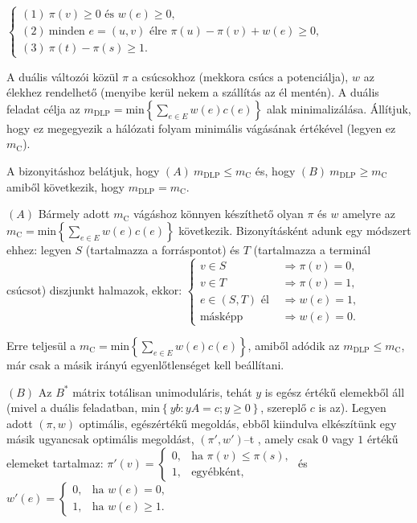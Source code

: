 $\begin{cases}
		(1)~\pi(v) \geq 0 \mbox{ és } w(e) \geq 0,                             \\
		(2)~\mbox{minden } e = (u,v) \mbox{ élre }  \pi(u)-\pi(v)+w(e) \geq 0, \\
		(3)~\pi(t)-\pi(s) \geq 1.\end{cases}$

A duális változói közül $\pi$ a csúcsokhoz (mekkora csúcs a potenciálja), $w$ az
élekhez rendelhető (menyibe kerül nekem a szállítás az él mentén). A duális
feladat célja az $m_{\text{DLP}}= \mbox{min} \left\{ \sum_{e\in E}^{}
	w(e)c(e)\right\}$ alak minimalizálása. Állítjuk, hogy ez megegyezik a hálózati
folyam minimális vágásának értékével (legyen ez $m_{\text{C}}$).

A bizonyitáshoz belátjuk, hogy $(A)~m_{\mbox{DLP}} \leq m_{\mbox{C}}$ és, hogy
$(B)~m_{\mbox{DLP}} \geq m_{\mbox{C}}$ amiből következik, hogy $ m_{\mbox{DLP}}
	= m_{\mbox{C}}$.

$(A)$ Bármely adott $m_{\mbox{C}}$ vágáshoz könnyen készíthető olyan $\pi$ és $w$
amelyre az $m_{\text{C}}= \mbox{min} \left\{ \sum_{e\in E}^{} w(e)c(e)\right\}$
következik. Bizonyításként adunk egy módszert ehhez: legyen $S$ (tartalmazza a
forráspontot) és $T$ (tartalmazza a terminál csúcsot) diszjunkt halmazok, ekkor:
$\begin{cases}
		v \in S                 & \Rightarrow \pi(v)=0, \\
		v \in T                 & \Rightarrow \pi(v)=1, \\
		e \in (S,T) \mbox{ él } & \Rightarrow w(e)=1,   \\
		\mbox{másképp}          & \Rightarrow w(e)=0.
	\end{cases}$

Erre teljesül a $m_{\text{C}}= \mbox{min} \left\{ \sum_{e\in E}^{}
	w(e)c(e)\right\}$, amiből adódik az $m_{\mbox{DLP}} \leq m_{\mbox{C}}$, már csak
a másik irányú egyenlőtlenséget kell beállítani.

$(B)$ Az $B^*$ mátrix totálisan unimoduláris, tehát $y$ is egész értékű elemekből
áll (mivel a duális feladatban, min$\left\{ yb:yA=c; y\geq 0 \right\}$, szereplő
$c$ is az). Legyen adott $(\pi,w)$ optimális, egészértékű megoldás, ebből
kiindulva elkészítünk egy másik ugyancsak optimális megoldást, $(\pi',w')$--t
, amely csak $0$ vagy $1$ értékű elemeket tartalmaz:
$\pi'(v)=
	\begin{cases}
		0, & \mbox{ha } \pi(v) \leq \pi(s), \\
		1, & \mbox{egyébként},
	\end{cases}$ és
$w'(e)=
	\begin{cases}
		0, & \mbox{ha } w(e)=0,      \\
		1, & \mbox{ha } w(e) \geq 1.
	\end{cases}$

